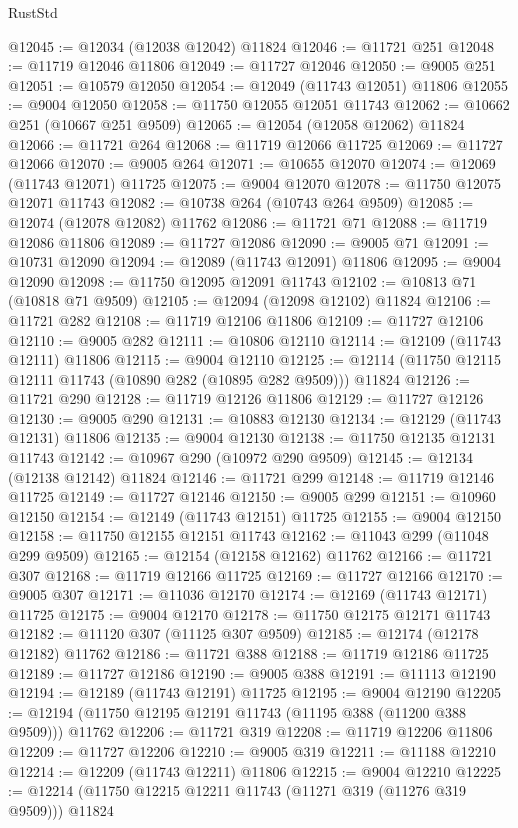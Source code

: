 \begin{lexlean}{RustStd}
\begin{coremodule}
@12045 := @12034 (@12038 @12042) @11824
@12046 := @11721 @251
@12048 := @11719 @12046 @11806
@12049 := @11727 @12046
@12050 := @9005 @251
@12051 := @10579 @12050
@12054 := @12049 (@11743 @12051) @11806
@12055 := @9004 @12050
@12058 := @11750 @12055 @12051 @11743
@12062 := @10662 @251 (@10667 @251 @9509)
@12065 := @12054 (@12058 @12062) @11824
@12066 := @11721 @264
@12068 := @11719 @12066 @11725
@12069 := @11727 @12066
@12070 := @9005 @264
@12071 := @10655 @12070
@12074 := @12069 (@11743 @12071) @11725
@12075 := @9004 @12070
@12078 := @11750 @12075 @12071 @11743
@12082 := @10738 @264 (@10743 @264 @9509)
@12085 := @12074 (@12078 @12082) @11762
@12086 := @11721 @71
@12088 := @11719 @12086 @11806
@12089 := @11727 @12086
@12090 := @9005 @71
@12091 := @10731 @12090
@12094 := @12089 (@11743 @12091) @11806
@12095 := @9004 @12090
@12098 := @11750 @12095 @12091 @11743
@12102 := @10813 @71 (@10818 @71 @9509)
@12105 := @12094 (@12098 @12102) @11824
@12106 := @11721 @282
@12108 := @11719 @12106 @11806
@12109 := @11727 @12106
@12110 := @9005 @282
@12111 := @10806 @12110
@12114 := @12109 (@11743 @12111) @11806
@12115 := @9004 @12110
@12125 := @12114 (@11750 @12115 @12111 @11743 (@10890 @282 (@10895 @282 @9509))) @11824
@12126 := @11721 @290
@12128 := @11719 @12126 @11806
@12129 := @11727 @12126
@12130 := @9005 @290
@12131 := @10883 @12130
@12134 := @12129 (@11743 @12131) @11806
@12135 := @9004 @12130
@12138 := @11750 @12135 @12131 @11743
@12142 := @10967 @290 (@10972 @290 @9509)
@12145 := @12134 (@12138 @12142) @11824
@12146 := @11721 @299
@12148 := @11719 @12146 @11725
@12149 := @11727 @12146
@12150 := @9005 @299
@12151 := @10960 @12150
@12154 := @12149 (@11743 @12151) @11725
@12155 := @9004 @12150
@12158 := @11750 @12155 @12151 @11743
@12162 := @11043 @299 (@11048 @299 @9509)
@12165 := @12154 (@12158 @12162) @11762
@12166 := @11721 @307
@12168 := @11719 @12166 @11725
@12169 := @11727 @12166
@12170 := @9005 @307
@12171 := @11036 @12170
@12174 := @12169 (@11743 @12171) @11725
@12175 := @9004 @12170
@12178 := @11750 @12175 @12171 @11743
@12182 := @11120 @307 (@11125 @307 @9509)
@12185 := @12174 (@12178 @12182) @11762
@12186 := @11721 @388
@12188 := @11719 @12186 @11725
@12189 := @11727 @12186
@12190 := @9005 @388
@12191 := @11113 @12190
@12194 := @12189 (@11743 @12191) @11725
@12195 := @9004 @12190
@12205 := @12194 (@11750 @12195 @12191 @11743 (@11195 @388 (@11200 @388 @9509))) @11762
@12206 := @11721 @319
@12208 := @11719 @12206 @11806
@12209 := @11727 @12206
@12210 := @9005 @319
@12211 := @11188 @12210
@12214 := @12209 (@11743 @12211) @11806
@12215 := @9004 @12210
@12225 := @12214 (@11750 @12215 @12211 @11743 (@11271 @319 (@11276 @319 @9509))) @11824

\end{coremodule}
\end{lexlean}
